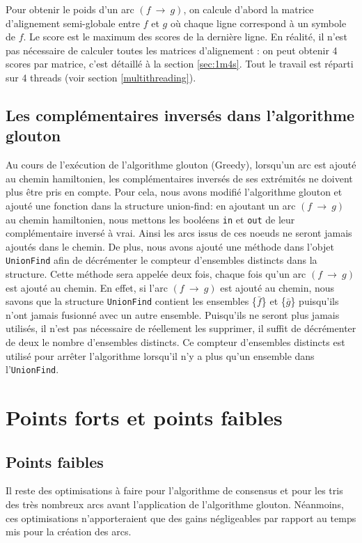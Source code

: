 \documentclass[a4paper, 12pt, titlepage]{article}
\newcommand{\arc}[2]{$(#1~\rightarrow~#2)$}
\begin{document}
Pour obtenir le poids d'un arc \arc{f}{g},
on calcule d'abord la matrice d'alignement semi-globale entre $f$ et $g$
où chaque ligne correspond à un symbole de $f$.
Le score est le maximum des scores de la dernière ligne.
En réalité, il n'est pas nécessaire de calculer
toutes les matrices d'alignement : on peut obtenir 4 scores par matrice,
c'est détaillé à la section \ref{sec:1m4s}.
Tout le travail est réparti sur 4 threads (voir section \ref{multithreading}).

\subsection{Les complémentaires inversés dans l'algorithme glouton}%
Au cours de l'exécution de l'algorithme glouton (Greedy), lorsqu'un arc est ajouté au chemin hamiltonien, les complémentaires inversés de ses extrémités ne doivent plus être pris en compte.
Pour cela, nous avons modifié l'algorithme glouton et ajouté une fonction dans la structure union-find:
en ajoutant un arc \arc{f}{g} au chemin hamiltonien, nous mettons les booléens \texttt{in} et \texttt{out} de leur complémentaire inversé à vrai.
Ainsi les arcs issus de ces noeuds ne seront jamais ajoutés dans le chemin.
De plus, nous avons ajouté une méthode dans l'objet \texttt{UnionFind} afin de décrémenter le compteur d'ensembles distincts dans la structure.
Cette méthode sera appelée deux fois, chaque fois qu'un arc \arc{f}{g} est ajouté au chemin.
En effet, si l'arc \arc{f}{g} est ajouté au chemin, nous savons que la structure \texttt{UnionFind} contient les ensembles \{$\bar{f}$\} et \{$\bar{g}$\} puisqu'ils n'ont jamais fusionné avec un autre ensemble.
Puisqu'ils ne seront plus jamais utilisés, il n'est pas nécessaire de
réellement les supprimer, il suffit de décrémenter de deux le nombre d'ensembles distincts.
Ce compteur d'ensembles distincts est utilisé pour arrêter l'algorithme
lorsqu'il n'y a plus qu'un ensemble dans l'\texttt{UnionFind}.





\section{Points forts et points faibles}
\subsection*{Points faibles}
Il reste des optimisations à faire pour l'algorithme de consensus et pour les tris des très nombreux arcs avant l'application de l'algorithme glouton.
Néanmoins, ces optimisations n'apporteraient que des gains négligeables par rapport au temps mis pour la création des arcs.
\end{document}

